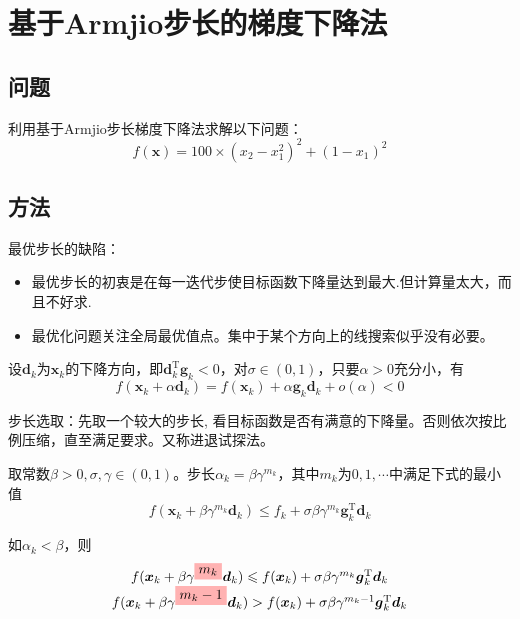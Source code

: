 \section{基于Armjio步长的梯度下降法}
\subsection{问题}
利用基于Armjio步长梯度下降法求解以下问题：
\begin{equation}\label{eq:Armjio}
    f(\boldsymbol{x}) = 100\times (x_2-x_1^2)^2+(1-x_1)^2
\end{equation}
\subsection{方法}
最优步长的缺陷：
\begin{itemize}
    \item 最优步长的初衷是在每一迭代步使目标函数下降量达到最大.但计算量太大，而且不好求. 
    \item 最优化问题关注全局最优值点。集中于某个方向上的线搜索似乎没有必要。
\end{itemize}

设$\boldsymbol{d}_k$为$\boldsymbol{x}_k$的下降方向，即$\boldsymbol{d}_{k}^{\mathrm{T}}\boldsymbol{g}_k<0$，对$\sigma\in\left( 0,1 \right)$，只要$\alpha>0$充分小，有
\[
    f(\boldsymbol{x}_k+\alpha\boldsymbol{d}_k) = f(\boldsymbol{x}_k)+\alpha \boldsymbol{g}_{k}\boldsymbol{d}_k+o(\alpha)<0
\]

步长选取：先取一个较大的步长, 看目标函数是否有满意的下降量。否则依次按比例压缩，直至满足要求。又称进退试探法。
\begin{definition}[Armijo步长规则]
    取常数$\beta>0,\sigma,\gamma\in(0,1)$。步长$\alpha_k = \beta \gamma^{m_k}$，其中$m_k$为$0,1,\cdots$中满足下式的最小值
    \[
        f(\boldsymbol{x}_k+\beta\gamma^{m_{k}}\boldsymbol{d}_k) \leqslant f_k+\sigma\beta\gamma^{m_{k}}\boldsymbol{g}_k^{\mathrm{T}}\boldsymbol{d}_k
    \]

    如$\alpha_k<\beta$，则
    \[
        \begin{array}{c}
            f(\boldsymbol{x}_k+\beta\gamma^{\colorbox{red!30}{$m_k$}}\boldsymbol{d}_k)\leqslant f(\boldsymbol{x}_k)+\sigma\beta\gamma^{m_k}\boldsymbol{g}_k^{\mathrm{T}}\boldsymbol{d}_k\\
            f(\boldsymbol{x}_k+\beta\gamma^{\colorbox{red!30}{$m_k-1$}}\boldsymbol{d}_k)> f(\boldsymbol{x}_k)+\sigma\beta\gamma^{m_k-1}\boldsymbol{g}_k^{\mathrm{T}}\boldsymbol{d}_k
        \end{array}
    \]
\end{definition}

